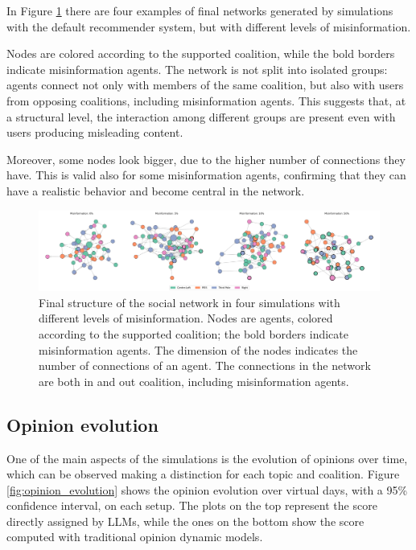 \medskip
In Figure \ref{fig:network_structure} there are four examples of final networks generated by simulations with the default recommender system, but with different levels of misinformation.

Nodes are colored according to the supported coalition, while the bold borders indicate misinformation agents.
The network is not split into isolated groups: agents connect not only with members of the same coalition, but also with users from opposing coalitions, including misinformation agents.
This suggests that, at a structural level, the interaction among different groups are present even with users producing misleading content.

Moreover, some nodes look bigger, due to the higher number of connections they have.
This is valid also for some misinformation agents, confirming that they can have a realistic behavior and become central in the network.

\begin{figure}[h]
    \centering
    \includegraphics[width=1\linewidth]{Images/Network/graphs_DefaultRecSys.png}
    \caption{Final structure of the social network in four simulations with different levels of misinformation. 
    Nodes are agents, colored according to the supported coalition; the bold borders indicate misinformation agents. 
    The dimension of the nodes indicates the number of connections of an agent.
    The connections in the network are both in and out coalition, including misinformation agents.}
    \label{fig:network_structure}
\end{figure}




\subsection{Opinion evolution}
One of the main aspects of the simulations is the evolution of opinions over time, which can be observed making a distinction for each topic and coalition.
Figure \ref{fig:opinion_evolution} shows the opinion evolution over virtual days, with a 95\% confidence interval, on each setup.
The plots on the top represent the score directly assigned by LLMs, while the ones on the bottom show the score computed with traditional opinion dynamic models.

